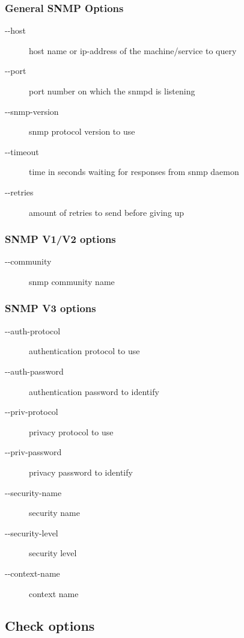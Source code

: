 \subsubsection{General SNMP Options}

\begin{description}
\item[-\--host] host name or ip-address of the machine/service to query
\item[-\--port] port number on which the snmpd is listening
\item[-\--snmp-version] snmp protocol version to use
\item[-\--timeout] time in seconds waiting for responses from snmp daemon
\item[-\--retries] amount of retries to send before giving up
\end{description}

\subsubsection{SNMP V1/V2 options}

\begin{description}
\item[-\--community] snmp community name
\end{description}

\subsubsection{SNMP V3 options}

\begin{description}
\item[-\--auth-protocol] authentication protocol to use
\item[-\--auth-password] authentication password to identify
\item[-\--priv-protocol] privacy protocol to use
\item[-\--priv-password] privacy password to identify
\item[-\--security-name] security name
\item[-\--security-level] security level
\item[-\--context-name] context name
\end{description}

\subsection{Check options}

